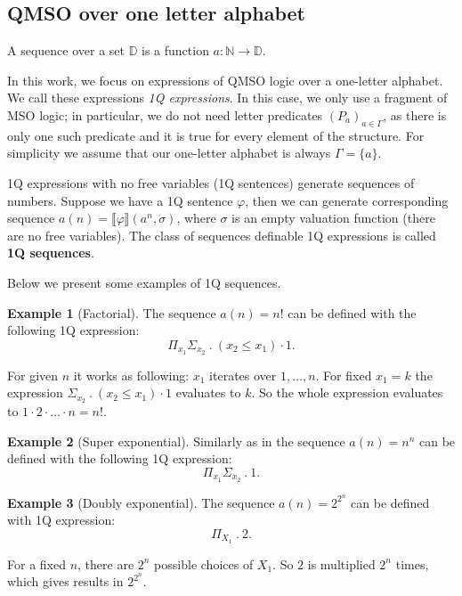 \documentclass[12pt]{article}
\theoremstyle{definition}
\newtheorem{example}{Example}[section]
\begin{document}
\subsection{QMSO over one letter alphabet}

A sequence over a set $\mathbb{D}$ is a function $a : \mathbb{N} \rightarrow \mathbb{D}$.

In this work, we focus on expressions of QMSO logic over a one-letter alphabet. We call these expressions \emph{1Q expressions}. In this case, we only use a fragment of MSO logic; in particular, we do not need letter predicates $(P_a)_{a \in \Gamma}$, as there is only one such predicate and it is true for every element of the structure. For simplicity we assume that our one-letter alphabet is always $\Gamma = \{a\}$.

1Q expressions with no free variables (1Q sentences) generate sequences of numbers. Suppose we have a 1Q sentence $\varphi$, then we can generate corresponding sequence $a(n) = \llbracket \varphi \rrbracket (a^n, \sigma)$, where $\sigma$ is an empty valuation function (there are no free variables). The class of sequences definable 1Q expressions is called \textbf{1Q sequences}.

Below we present some examples of 1Q sequences.

\begin{example}[Factorial]
\label{ExSeqFactorial}
    The sequence $a(n) = n!$ can be defined with the following 1Q expression: 
    $$\Pi_{x_1}\Sigma_{x_2} \ . \ (x_2 \leq x_1) \cdot 1.$$

    For given $n$ it works as following: $x_1$ iterates over $1,\ldots,n$. For fixed $x_1 = k$ the expression $\Sigma_{x_2} \ . \ (x_2 \leq x_1) \cdot 1$ evaluates to $k$. So the whole expression evaluates to $1 \cdot 2 \cdot \ldots \cdot n = n!$.
\end{example}

\begin{example}[Super exponential]
\label{ExSeqNToN}
    Similarly as in  the sequence $a(n) = n^n$ can be defined with the following 1Q expression:
    $$\Pi_{x_1}\Sigma_{x_2} \ . \ 1.$$
\end{example}

\begin{example}[Doubly exponential]
\label{ExSeqDoubleExponential}
    The sequence $a(n) = 2^{2^n}$ can be defined with 1Q expression:
    $$\Pi_{X_1} \ . \ 2.$$

    For a fixed $n$, there are $2^n$ possible choices of $X_1$. So $2$ is multiplied $2^n$ times, which gives results in $2^{2^n}$.
\end{example}
\end{document}
